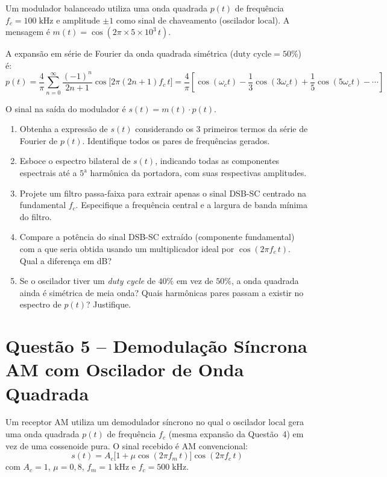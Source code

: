 \documentclass[11pt,a4paper]{article}
\begin{document}
Um modulador balanceado utiliza uma onda quadrada $p(t)$ de frequência $f_c = 100\;\text{kHz}$ e amplitude $\pm 1$ como sinal de chaveamento (oscilador local). A mensagem é $m(t) = \cos(2\pi \times 5 \times 10^3\,t)$.

A expansão em série de Fourier da onda quadrada simétrica ($\text{duty cycle} = 50\%$) é:
\[
  p(t) = \frac{4}{\pi}\sum_{n=0}^{\infty} \frac{(-1)^n}{2n+1}\cos\!\big[2\pi(2n+1)f_c\,t\big]
  = \frac{4}{\pi}\!\left[\cos(\omega_c t) - \frac{1}{3}\cos(3\omega_c t) + \frac{1}{5}\cos(5\omega_c t) - \cdots\right]
\]

O sinal na saída do modulador é $s(t) = m(t) \cdot p(t)$.

\begin{enumerate}[label=\alph*)]
  \item Obtenha a expressão de $s(t)$ considerando os 3 primeiros termos da série de Fourier de $p(t)$. Identifique todos os pares de frequências gerados.
  \item Esboce o espectro bilateral de $s(t)$, indicando todas as componentes espectrais até a $5^{\text{a}}$ harmônica da portadora, com suas respectivas amplitudes.
  \item Projete um filtro passa-faixa para extrair apenas o sinal DSB-SC centrado na fundamental $f_c$. Especifique a frequência central e a largura de banda mínima do filtro.
  \item Compare a potência do sinal DSB-SC extraído (componente fundamental) com a que seria obtida usando um multiplicador ideal por $\cos(2\pi f_c\,t)$. Qual a diferença em dB?
  \item Se o oscilador tiver um \textit{duty cycle} de $40\%$ em vez de $50\%$, a onda quadrada ainda é simétrica de meia onda? Quais harmônicas pares passam a existir no espectro de $p(t)$? Justifique.
\end{enumerate}

\section*{Questão 5 -- Demodulação Síncrona AM com Oscilador de Onda Quadrada}

Um receptor AM utiliza um demodulador síncrono no qual o oscilador local gera uma onda quadrada $p(t)$ de frequência $f_c$ (mesma expansão da Questão~4) em vez de uma cossenoide pura. O sinal recebido é AM convencional:
\[
  s(t) = A_c\big[1 + \mu\cos(2\pi f_m\, t)\big]\cos(2\pi f_c\, t)
\]
com $A_c = 1$, $\mu = 0{,}8$, $f_m = 1\;\text{kHz}$ e $f_c = 500\;\text{kHz}$.
\end{document}
